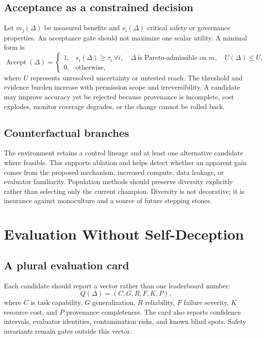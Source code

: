 \documentclass[11pt,a4paper]{article}
\begin{document}
\subsection{Acceptance as a constrained decision}

Let $m_j(\Delta)$ be measured benefits and $s_i(\Delta)$ critical safety or governance properties. An acceptance gate should not maximize one scalar utility. A minimal form is
\begin{equation}
\operatorname{Accept}(\Delta)=
\begin{cases}
1, & s_i(\Delta)\geq\tau_i\ \forall i,\quad
\Delta\ \text{is Pareto-admissible on }m,\quad
U(\Delta)\leq\bar{U},\\
0, & \text{otherwise},
\end{cases}
\end{equation}
where $U$ represents unresolved uncertainty or untested reach. The threshold and evidence burden increase with permission scope and irreversibility. A candidate may improve accuracy yet be rejected because provenance is incomplete, cost explodes, monitor coverage degrades, or the change cannot be rolled back.

\subsection{Counterfactual branches}

The environment retains a control lineage and at least one alternative candidate where feasible. This supports ablation and helps detect whether an apparent gain comes from the proposed mechanism, increased compute, data leakage, or evaluator familiarity. Population methods should preserve diversity explicitly rather than selecting only the current champion. Diversity is not decorative; it is insurance against monoculture and a source of future stepping stones.

\section{Evaluation Without Self-Deception}

\subsection{A plural evaluation card}

Each candidate should report a vector rather than one leaderboard number:
\begin{equation}
  Q(\Delta)=(C,G,R,F,K,P),
\end{equation}
where $C$ is task capability, $G$ generalization, $R$ reliability, $F$ failure severity, $K$ resource cost, and $P$ provenance completeness. The card also reports confidence intervals, evaluator identities, contamination risks, and known blind spots. Safety invariants remain gates outside this vector.
\end{document}
